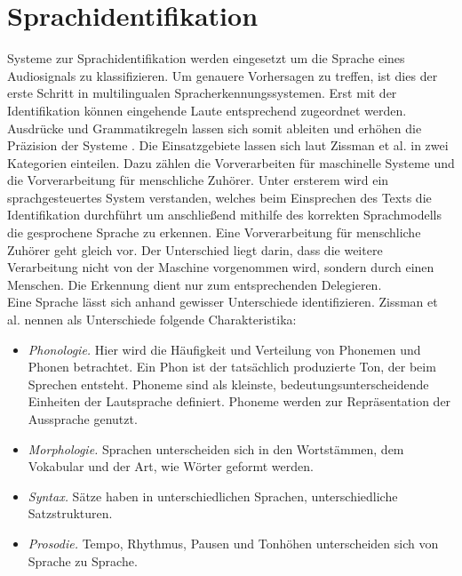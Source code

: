 \section{Sprachidentifikation}
Systeme zur Sprachidentifikation werden eingesetzt um die Sprache eines Audiosignals zu klassifizieren. Um genauere Vorhersagen zu treffen, ist dies der erste Schritt in multilingualen Spracherkennungssystemen. Erst mit der Identifikation können eingehende Laute entsprechend zugeordnet werden. Ausdrücke und Grammatikregeln lassen sich somit ableiten und erhöhen die Präzision der Systeme \cite{Bartz.2017}.
Die Einsatzgebiete lassen sich laut Zissman et al. \cite{Zissman.2001} in zwei Kategorien einteilen. Dazu zählen die Vorverarbeiten für maschinelle Systeme und die Vorverarbeitung für menschliche Zuhörer. Unter ersterem wird ein sprachgesteuertes System verstanden, welches beim Einsprechen des Texts die Identifikation durchführt um anschließend mithilfe des korrekten Sprachmodells die gesprochene Sprache zu erkennen. Eine Vorverarbeitung für menschliche Zuhörer geht gleich vor. Der Unterschied liegt darin, dass die weitere Verarbeitung nicht von der Maschine vorgenommen wird, sondern durch einen Menschen. Die Erkennung dient nur zum entsprechenden Delegieren.
\\
Eine Sprache lässt sich anhand gewisser Unterschiede identifizieren. Zissman et al. \cite{Zissman.2001} nennen als Unterschiede folgende Charakteristika:
\begin{itemize}
\item \textit{Phonologie.} Hier wird die Häufigkeit und Verteilung von Phonemen und Phonen betrachtet. Ein Phon ist der tatsächlich produzierte Ton, der beim Sprechen entsteht. Phoneme sind als kleinste, bedeutungsunterscheidende Einheiten der Lautsprache definiert. Phoneme werden zur Repräsentation der Aussprache genutzt.
\item \textit{Morphologie.} Sprachen unterscheiden sich in den Wortstämmen, dem Vokabular und der Art, wie Wörter geformt werden.
\item \textit{Syntax.} Sätze haben in unterschiedlichen Sprachen, unterschiedliche Satzstrukturen.
\item \textit{Prosodie.} Tempo, Rhythmus, Pausen und Tonhöhen unterscheiden sich von Sprache zu Sprache.
\end{itemize}

